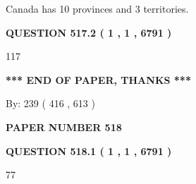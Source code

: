 \documentclass[12pt]{article}
\begin{document}
 
\noindent{}
 
 
Canada has 10  provinces and 3 territories.
 
 
 
 
  
\vspace{0.2in}
  
{\textbf{\Large{QUESTION
517.2 
 ( 1 , 1 , 6791 )
}}}
  
  
 
 
\noindent{}

117
 
 
   
   
 \vspace{0.2in}
 
   
   
   
   
\vspace{1.0in} 
{\textbf{\large{ *** END OF PAPER, THANKS *** }}} 
   
   
\hspace{1.0in} By: 
 239 ( 416 ,  613 )
   
   
   
   
\newpage 
\setcounter{page}{ 
   518001 } 
   
   
   
   
 {\textbf{ \Large{ PAPER NUMBER  518  }}}
   
   
\vspace{0.2in}
   
   
   
   
   
   
 \vspace{0.2in}
 
 
 
 
   
   
  
\vspace{0.2in}
  
{\textbf{\Large{QUESTION
518.1 
 ( 1 , 1 , 6791 )
}}}
  
  
 
 
\noindent{}

77
 
 
  
\end{document}
